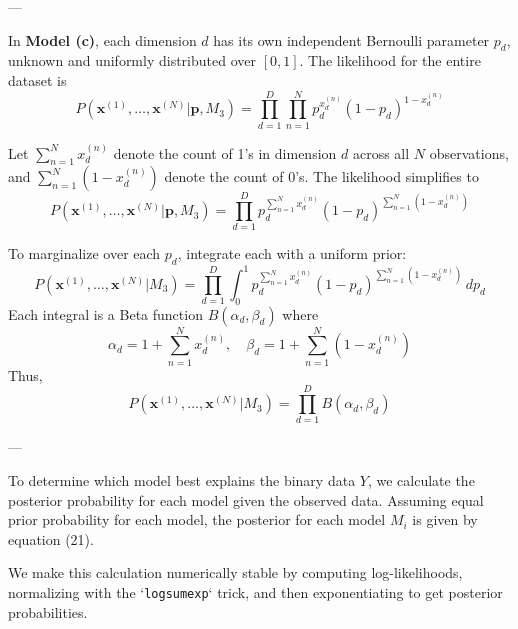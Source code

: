 \documentclass{article}
\begin{document}
    \noindent
    ---
    
    \noindent In \textbf{Model (c)}, each dimension \( d \) has its own independent Bernoulli parameter \( p_d \), unknown and uniformly distributed over \( [0, 1] \). The likelihood for the entire dataset is
    \begin{equation}
        P(\mathbf{x}^{(1)}, \dots, \mathbf{x}^{(N)} | \mathbf{p}, M_3) = \prod_{d=1}^{D} \prod_{n=1}^{N} p_d^{x_d^{(n)}} (1 - p_d)^{1 - x_d^{(n)}}
    \end{equation}
    
    \noindent Let \( \sum_{n=1}^N x_d^{(n)} \) denote the count of 1's in dimension \( d \) across all \( N \) observations, and \( \sum_{n=1}^N (1 - x_d^{(n)}) \) denote the count of 0's. The likelihood simplifies to
    \begin{equation}
        P(\mathbf{x}^{(1)}, \dots, \mathbf{x}^{(N)} | \mathbf{p}, M_3) = \prod_{d=1}^{D} p_d^{\sum_{n=1}^N x_d^{(n)}} (1 - p_d)^{\sum_{n=1}^N (1 - x_d^{(n)})}
    \end{equation}
    
    \noindent To marginalize over each \( p_d \), integrate each with a uniform prior:
    \begin{equation}
        P(\mathbf{x}^{(1)}, \dots, \mathbf{x}^{(N)} | M_3) = \prod_{d=1}^{D} \int_0^1 p_d^{\sum_{n=1}^N x_d^{(n)}} (1 - p_d)^{\sum_{n=1}^N (1 - x_d^{(n)})} \, dp_d
    \end{equation}
    Each integral is a Beta function \( B(\alpha_{d}, \beta_{d}) \) where
    \begin{equation}
        \alpha_{d} = 1 + \sum_{n=1}^N x_d^{(n)}, \quad \beta_{d} = 1 + \sum_{n=1}^N (1 - x_d^{(n)})
    \end{equation}
    Thus,
    \begin{equation}
        P(\mathbf{x}^{(1)}, \dots, \mathbf{x}^{(N)} | M_3) = \prod_{d=1}^{D} B(\alpha_{d}, \beta_{d})
    \end{equation}


    \noindent
    ---
    \vspace{10pt}
    
    \noindent To determine which model best explains the binary data \( Y \), we calculate the posterior probability for each model given the observed data. Assuming equal prior probability for each model, the posterior for each model \( M_i \) is given by equation (21).
    \vspace{10pt}
    
    \noindent We make this calculation numerically stable by computing log-likelihoods, normalizing with the `\texttt{logsumexp}` trick, and then exponentiating to get posterior probabilities.
    
\end{document}
